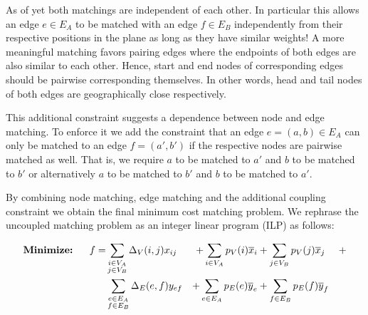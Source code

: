 		As of yet both matchings are independent of each other. In particular this allows an edge $e \in E_A$ to be matched with an edge $f \in E_B$ independently from their respective positions in the plane as long as they have similar weights! A more meaningful matching favors pairing edges where the endpoints of both edges are also similar to each other. Hence, start and end nodes of corresponding edges should be pairwise corresponding themselves. In other words, head and tail nodes of both edges are geographically close respectively. 

		This additional constraint suggests a dependence between node and edge matching. To enforce it we add the constraint that an edge $e = (a,b) \in E_A$ can only be matched to an edge $f = (a',b')$ if the respective nodes are pairwise matched as well. That is, we require $a$ to be matched to $a'$ and $b$ to be matched to $b'$ or alternatively $a$ to be matched to $b'$ and $b$ to be matched to $a'$. 

		By combining node matching, edge matching and the additional coupling constraint we obtain the final minimum cost matching problem. We rephrase the uncoupled matching problem as an integer linear program (ILP) as follows:

		\begin{alignat}{4}
		\textbf{Minimize:} &  & \ \ f = &\sum_{ \substack{i \in V_A \\ j \in V_B }} \Delta_V(i,j) x_{ij}  &+  \sum_{ \substack{i \in V_A}} p_{V}(i) \overline{x}_{i} &+   \sum_{ \substack{j \in V_B}} p_{V}(j) \overline{x}_{j} & + \notag \\ 
		 &   & \ \     &\sum_{ \substack{e \in E_A \\ f \in E_B }} \Delta_E(e,f) y_{ef}  &+  \sum_{ \substack{e \in E_A}} p_{E}(e) \overline{y}_{e} &+   \sum_{ \substack{f \in E_B}} p_{E}(f) \overline{y}_{f} &
		\end{alignat}


